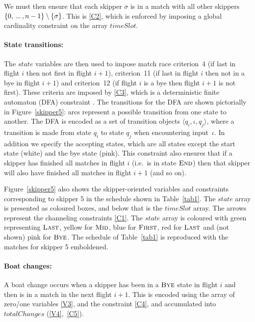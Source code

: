 \documentclass{llncs}
\newcommand{\timeSlot}{\mathit{timeSlot}}
\newcommand{\state}{\mathit{state}}
\newcommand{\totalChanges}{\mathit{totalChanges}}
\newcommand{\FIRST}{\textnormal{\textsc{First}}}
\newcommand{\MID}{\textnormal{\textsc{Mid}}}
\newcommand{\LAST}{\textnormal{\textsc{Last}}}
\newcommand{\END}{\textnormal{\textsc{End}}}
\newcommand{\BYE}{\textnormal{\textsc{Bye}}}
\newcommand\nldots{\,\hbox to 0.8em{.\hss.\hss.}\,}
\begin{document}
We must then ensure that each skipper $\sigma$ is in a match with all other skippers $\{0, \nldots,
n-1\} \setminus \{\sigma\}$. This is \eqref{C2}, which is enforced by imposing a global
cardinality constraint \cite{globCard} on the array $\timeSlot$.

\paragraph{State transitions:} The $\state$ variables are then used to impose match race criterion~4
(if last in flight $i$ then not first in flight $i+1$), criterion~11 (if last in flight $i$ then not
in a bye in flight $i+1$) and criterion~12 (if flight $i$ is a bye then flight $i+1$ is not first).
These criteria are imposed by \eqref{C3}, which is a deterministic finite automaton (DFA) constraint
\cite{Pesant04}. The transitions for the DFA are shown pictorially in Figure~\ref{skipper5}: arcs
represent a possible transition from one state to another. The DFA is encoded as a set of transition objects
$\langle q_{i},\iota,q_{j} \rangle$, where a transition is made from state $q_{i}$ to state $q_{j}$
when encountering input~$\iota$. In addition we specify the accepting states, which are all states
except the start state (white) and the bye state (pink).  This constraint also ensures that if a
skipper has finished all matches in flight $i$ (i.e.\ is in state $\END$) then that skipper will also have
finished all matches in flight $i+1$ (and so on).

Figure~\ref{skipper5} also shows the skipper-oriented variables and constraints corresponding to
skipper 5 in the schedule shown in Table~\ref{tab1}. The $\state$ array is presented as coloured boxes, and
below that is the $\timeSlot$ array. The arrows represent the channeling constraints \eqref{C1}. The
$\state$ array is coloured with green representing $\LAST$, yellow for $\MID$, blue for $\FIRST$,
red for $\LAST$ and (not shown) pink for $\BYE$. The schedule of Table~\ref{tab1} is reproduced with
the matches for skipper 5 emboldened.

\paragraph{Boat changes:} A boat change occurs when a skipper has been in a $\BYE$ state in flight
$i$ and then is in a match in the next flight $i+1$.  This is encoded using the array of zero/one
variables \eqref{V3}, and the constraint \eqref{C4}, and accumulated into $\totalChanges$
(\ref{V4},~\ref{C5}).
\end{document}
